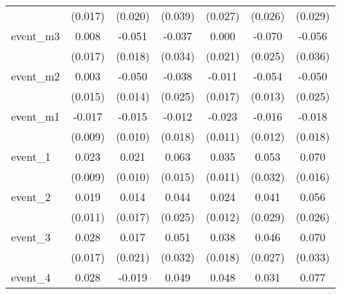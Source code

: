 {\begin{tabular}{l*{6}{c}}
            &     (0.017)         &     (0.020)         &     (0.039)         &     (0.027)         &     (0.026)         &     (0.029)         \\
[1em]
event\_m3    &       0.008         &      -0.051\sym{**} &      -0.037         &       0.000         &      -0.070\sym{**} &      -0.056         \\
            &     (0.017)         &     (0.018)         &     (0.034)         &     (0.021)         &     (0.025)         &     (0.036)         \\
[1em]
event\_m2    &       0.003         &      -0.050\sym{***}&      -0.038         &      -0.011         &      -0.054\sym{***}&      -0.050\sym{*}  \\
            &     (0.015)         &     (0.014)         &     (0.025)         &     (0.017)         &     (0.013)         &     (0.025)         \\
[1em]
event\_m1    &      -0.017         &      -0.015         &      -0.012         &      -0.023\sym{*}  &      -0.016         &      -0.018         \\
            &     (0.009)         &     (0.010)         &     (0.018)         &     (0.011)         &     (0.012)         &     (0.018)         \\
[1em]
event\_1     &       0.023\sym{**} &       0.021\sym{*}  &       0.063\sym{***}&       0.035\sym{**} &       0.053         &       0.070\sym{***}\\
            &     (0.009)         &     (0.010)         &     (0.015)         &     (0.011)         &     (0.032)         &     (0.016)         \\
[1em]
event\_2     &       0.019         &       0.014         &       0.044         &       0.024\sym{*}  &       0.041         &       0.056\sym{*}  \\
            &     (0.011)         &     (0.017)         &     (0.025)         &     (0.012)         &     (0.029)         &     (0.026)         \\
[1em]
event\_3     &       0.028         &       0.017         &       0.051         &       0.038\sym{*}  &       0.046         &       0.070\sym{*}  \\
            &     (0.017)         &     (0.021)         &     (0.032)         &     (0.018)         &     (0.027)         &     (0.033)         \\
[1em]
event\_4     &       0.028         &      -0.019         &       0.049         &       0.048\sym{***}&       0.031         &       0.077\sym{**} \\

\end{tabular}}

